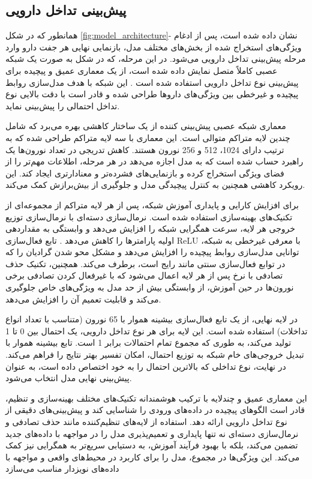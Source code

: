 \subsection{پیش‌بینی تداخل دارویی}

همانطور که در شکل \ref{fig:model_architecture}- نشان داده شده است، پس از ادغام ویژگی‌های استخراج شده از بخش‌های مختلف مدل، بازنمایی نهایی هر جفت دارو وارد مرحله پیش‌بینی تداخل دارویی می‌شود. در این مرحله، که در شکل به صورت یک شبکه عصبی کاملاً متصل نمایش داده شده است، از یک معماری عمیق و پیچیده برای پیش‌بینی نوع تداخل دارویی استفاده شده است \cite{ref_dai2020}. این شبکه با هدف مدل‌سازی روابط پیچیده و غیرخطی بین ویژگی‌های داروها طراحی شده و قادر است با دقت بالایی نوع تداخل احتمالی را پیش‌بینی نماید.

معماری شبکه عصبی پیش‌بینی کننده از یک ساختار کاهشی بهره می‌برد که شامل چندین لایه متراکم متوالی است. این معماری با سه لایه متراکم طراحی شده که به ترتیب دارای 1024، 512 و 256 نورون هستند. کاهش تدریجی در تعداد نورون‌ها یک راهبرد حساب شده است که به مدل اجازه می‌دهد در هر مرحله، اطلاعات مهم‌تر را از فضای ویژگی استخراج کرده و بازنمایی‌های فشرده‌تر و معنادارتری ایجاد کند. این رویکرد کاهشی همچنین به کنترل پیچیدگی مدل و جلوگیری از بیش‌برازش کمک می‌کند.

برای افزایش کارایی و پایداری آموزش شبکه، پس از هر لایه متراکم از مجموعه‌ای از تکنیک‌های بهینه‌سازی استفاده شده است. نرمال‌سازی دسته‌ای با نرمال‌سازی توزیع خروجی هر لایه، سرعت همگرایی شبکه را افزایش می‌دهد و وابستگی به مقداردهی اولیه پارامترها را کاهش می‌دهد \cite{ref_dai2020}. تابع فعال‌سازی ReLU با معرفی غیرخطی به شبکه، توانایی مدل‌سازی روابط پیچیده را افزایش می‌دهد و مشکل محو شدن گرادیان را که در توابع فعال‌سازی سنتی مانند  رایج است، برطرف می‌کند. همچنین، تکنیک حذف تصادفی با نرخ  پس از هر لایه اعمال می‌شود که با غیرفعال کردن تصادفی برخی نورون‌ها در حین آموزش، از وابستگی بیش از حد مدل به ویژگی‌های خاص جلوگیری می‌کند و قابلیت تعمیم آن را افزایش می‌دهد.

در لایه نهایی، از یک تابع فعال‌سازی بیشینه هموار با 65 نورون (متناسب با تعداد انواع تداخلات) استفاده شده است. این لایه برای هر نوع تداخل دارویی، یک احتمال بین 0 تا 1 تولید می‌کند، به طوری که مجموع تمام احتمالات برابر 1 است. تابع بیشینه هموار با تبدیل خروجی‌های خام شبکه به توزیع احتمال، امکان تفسیر بهتر نتایج را فراهم می‌کند. در نهایت، نوع تداخلی که بالاترین احتمال را به خود اختصاص داده است، به عنوان پیش‌بینی نهایی مدل انتخاب می‌شود.

این معماری عمیق و چندلایه با ترکیب هوشمندانه تکنیک‌های مختلف بهینه‌سازی و تنظیم، قادر است الگوهای پیچیده در داده‌های ورودی را شناسایی کند و پیش‌بینی‌های دقیقی از نوع تداخل دارویی ارائه دهد. استفاده از لایه‌های تنظیم‌کننده مانند حذف تصادفی و نرمال‌سازی دسته‌ای نه تنها پایداری و تعمیم‌پذیری مدل را در مواجهه با داده‌های جدید تضمین می‌کند، بلکه با بهبود فرآیند آموزش، به دستیابی سریع‌تر به همگرایی نیز کمک می‌کند. این ویژگی‌ها در مجموع، مدل را برای کاربرد در محیط‌های واقعی و مواجهه با داده‌های نویزدار مناسب می‌سازد

